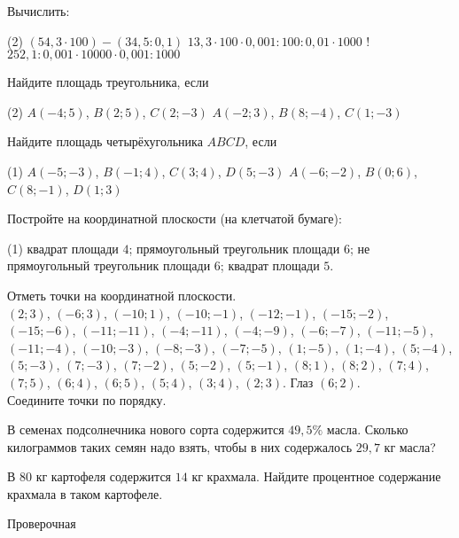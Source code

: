 \begin{class}[number=7-8]
	\begin{listofex}
		\item Вычислить:
		\begin{tasks}(2)
			\task \( (54,3\cdot100)-(34,5:0,1) \)
			\task \( 13,3\cdot100\cdot0,001:100:0,01\cdot1000 \)
			\task! \( 252,1:0,001\cdot10000\cdot0,001:1000 \)
		\end{tasks}
		\item Найдите площадь треугольника, если
		\begin{tasks}(2)
			\task \( A (-4;5) \), \( B (2;5) \), \( C (2;-3) \)
			\task \( A (-2;3) \), \( B (8;-4) \), \( C (1;-3) \)
		\end{tasks}
		\item Найдите площадь четырёхугольника \( ABCD \), если
		\begin{tasks}(1)
			\task \( A (-5;-3) \), \( B (-1;4) \), \( C (3;4) \), \( D (5;-3) \)
			\task \( A (-6;-2) \), \( B (0;6) \), \( C (8;-1) \), \( D (1;3) \)
		\end{tasks}
		\item Постройте на координатной плоскости (на клетчатой бумаге):
		\begin{tasks}(1)
			\task квадрат площади \( 4 \);
			\task прямоугольный треугольник площади \( 6 \);
			\task не прямоугольный треугольник площади \( 6 \);
			\task квадрат площади \( 5 \).
		\end{tasks}
		\item Отметь точки на координатной плоскости.\\ \( (2; 3) \), \( (-6; 3) \), \( (-10; 1) \), \( (-10; -1) \), \( (-12; -1) \), \( (-15; -2) \), \( (-15; -6) \), \( (-11; -11) \), \( (-4; -11) \), \( (-4; -9) \), \( (-6;-7) \), \( (-11; -5) \), \( (-11; -4) \), \( (-10;-3) \), \( (-8; -3) \), \( (-7; -5) \), \( (1; -5) \), \( (1; -4) \), \( (5; -4) \), \( (5; -3) \), \( (7; -3) \), \( (7; -2) \), \( (5; -2) \), \( (5; -1) \), \( (8; 1) \), \( (8; 2) \), \( (7; 4) \), \( (7; 5) \), \( (6; 4) \), \( (6; 5) \), \( (5; 4) \), \( (3; 4) \), \( (2; 3) \). Глаз \( (6; 2) \).\\ Соедините точки по порядку.
		\item В семенах подсолнечника нового сорта содержится \( 49,5\% \) масла. Сколько килограммов таких семян надо взять, чтобы в них содержалось \( 29,7 \) кг масла?
		\item В \( 80 \) кг картофеля содержится \( 14 \) кг крахмала. Найдите процентное содержание крахмала в таком картофеле.
	\end{listofex}
\end{class}

\begin{exam}
	\begin{listofex}
		\item Проверочная
	\end{listofex}
\end{exam}
